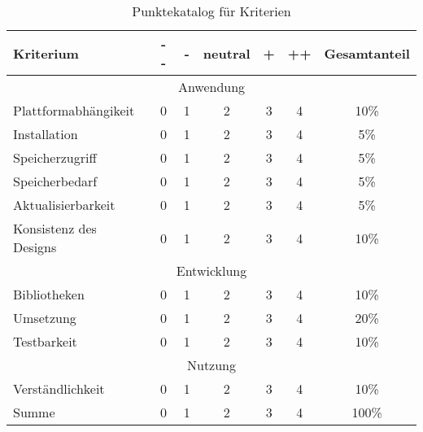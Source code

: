 

\begin{table}[h]
    \centering
    \begin{tabularx}{\textwidth}{|l||c|c|c|c|c|c|}
        \hline
        Kriterium & - - & - & neutral & + &++& Gesamtanteil \\
        \hline
    		\multicolumn{7}{c}{Anwendung}\\
    	\hline
        Plattformabhängikeit & 0 & 1 & 2 & 3 & 4 & 10\%\\
        Installation  		& 0 & 1 & 2 & 3 & 4 & 5\%\\
        Speicherzugriff		& 0 & 1 & 2 & 3 & 4 & 5\%\\        
        Speicherbedarf 		& 0 & 1 & 2 & 3 & 4 & 5\%\\
        Aktualisierbarkeit 	& 0 & 1 & 2 & 3 & 4 & 5\%\\
        Konsistenz des Designs 	& 0 & 1 & 2 & 3 & 4 & 10\%\\

		\hline
			\multicolumn{7}{c}{Entwicklung}\\
		\hline
		Bibliotheken	& 0 & 1 & 2 & 3 & 4 & 10\%\\
		Umsetzung	& 0 & 1 & 2 & 3 & 4 & 20\%\\
		Testbarkeit	& 0 & 1 & 2 & 3 & 4 & 10\%\\

        \hline
        	\multicolumn{7}{c}{Nutzung}\\
        \hline
        Verständlichkeit	& 0 & 1 & 2 & 3 & 4 & 10\%\\
        \hline
        
        \hline
        Summe 				& 0 & 1 & 2 & 3 & 4 & 100\%\\
        \hline


    \end{tabularx}
    \caption{Punktekatalog für Kriterien} \label{tab:punktekatalog}
\end{table}

